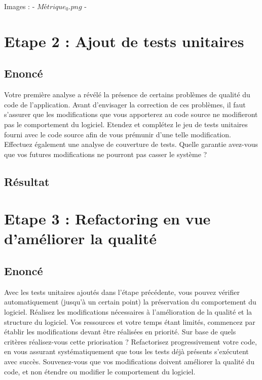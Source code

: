 \documentclass[12pt,a4paper,final]{article}
\begin{document}
Images : 
- $Métrique_0.png$
- 

\section{Etape 2 : Ajout de tests unitaires}\label{sec:etape2}
\subsection{Enoncé}
Votre première analyse a révélé la présence de certains problèmes de qualité du code de l'application.
Avant d'envisager la correction de ces problèmes, il faut s'assurer que les modifications que vous apporterez au code source ne modifieront pas le comportement du logiciel.
Etendez et complétez le jeu de tests unitaires fourni avec le code source afin de vous prémunir d'une telle modification. Effectuez également une analyse de couverture de tests.
Quelle garantie avez-vous que vos futures modifications ne pourront pas casser le système ?

\subsection{Résultat}



\section{Etape 3 : Refactoring en vue d'améliorer la qualité}\label{sec:etape3}
\subsection{Enoncé}
Avec les tests unitaires ajoutés dans l'étape précédente, vous pouvez vérifier automatiquement (jusqu'à un certain point) la préservation du comportement du logiciel. Réalisez les modifications nécessaires à l'amélioration de la qualité et la structure du logiciel. 
Vos ressources et votre temps étant limités, commencez par établir les modifications devant être réalisées en priorité. Sur base de quels critères réalisez-vous cette priorisation ?
Refactorisez progressivement votre code, en vous assurant systématiquement que tous les tests déjà présents s'exécutent avec succès. Souvenez-vous que vos modifications doivent améliorer la qualité du code, et non étendre ou modifier le comportement du logiciel.
\end{document}
